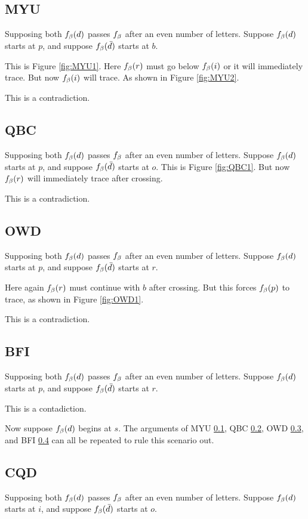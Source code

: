 \subsection{MYU}\label{MYU}
Supposing both $f_\beta(d)$ passes $f_\beta$ after an even number of letters. Suppose $f_\beta(d)$ starts at $p$, and suppose $f_\beta(\bar{d})$ starts at $b$.

This is Figure \ref{fig:MYU1}. Here $f_\beta(r)$ must go below $f_\beta(i)$ or it will immediately trace. But now $f_\beta(i)$ will trace. As shown in Figure \ref{fig:MYU2}.

This is a contradiction.

\subsection{QBC}\label{QBC}
Supposing both $f_\beta(d)$ passes $f_\beta$ after an even number of letters. Suppose $f_\beta(d)$ starts at $p$, and suppose $f_\beta(\bar{d})$ starts at $o$. This is Figure \ref{fig:QBC1}. But now $f_\beta(r)$ will immediately trace after crossing.

This is a contradiction.

\subsection{OWD}\label{OWD}
Supposing both $f_\beta(d)$ passes $f_\beta$ after an even number of letters. Suppose $f_\beta(d)$ starts at $p$, and suppose $f_\beta(\bar{d})$ starts at $r$.

Here again $f_\beta(r)$ must continue with $b$ after crossing. But this forces $f_\beta(p)$ to trace, as shown in Figure \ref{fig:OWD1}.

This is a contradiction.

\subsection{BFI}\label{BFI}
Supposing both $f_\beta(d)$ passes $f_\beta$ after an even number of letters. Suppose $f_\beta(d)$ starts at $p$, and suppose $f_\beta(\bar{d})$ starts at $r$.

This is a contadiction.

Now suppose $f_\beta(d)$ begins at $s$. The arguments of MYU \ref{MYU}, QBC \ref{QBC}, OWD \ref{OWD}, and BFI \ref{BFI} can all be repeated to rule this scenario out.

\subsection{CQD}\label{CQD}
Supposing both $f_\beta(d)$ passes $f_\beta$ after an even number of letters. Suppose $f_\beta(d)$ starts at $i$, and suppose $f_\beta(\bar{d})$ starts at $o$.

